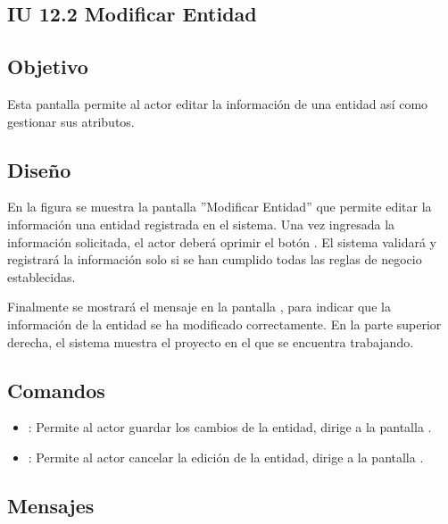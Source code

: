\subsection{IU 12.2 Modificar Entidad}

\subsection{Objetivo}
	Esta pantalla permite al actor editar la información de una entidad así como gestionar sus atributos.
\subsection{Diseño}
	En la figura  se muestra la pantalla ''Modificar Entidad'' que permite editar la información una entidad registrada en el sistema.
	Una vez ingresada la información solicitada, el actor deberá oprimir el botón  . El sistema validará y registrará la información solo si se han cumplido todas las reglas de negocio establecidas.
	
	Finalmente se mostrará el mensaje  en la pantalla , para indicar que la información de la entidad se ha modificado correctamente.
	En la parte superior derecha, el sistema muestra el proyecto en el que se encuentra trabajando.

\subsection{Comandos}
\begin{itemize}
	\item {}: Permite al actor guardar los cambios de la entidad, dirige a la pantalla .
	\item {}: Permite al actor cancelar la edición de la entidad, dirige a la pantalla .
\end{itemize}

\subsection{Mensajes}

